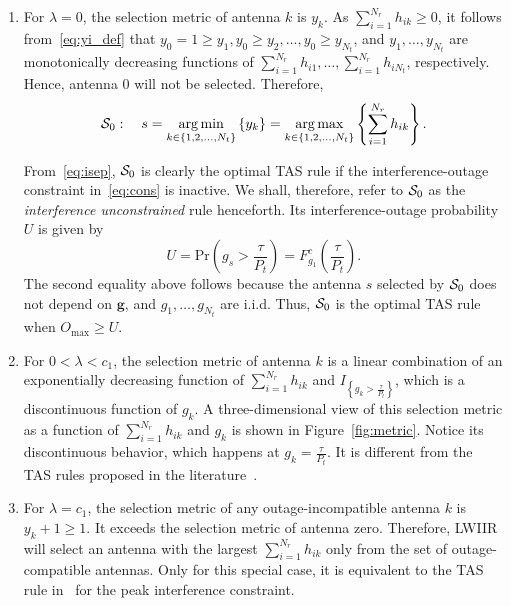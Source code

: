 \documentclass[12pt,draftcls,peerreview,onecolumn]{IEEEtran}
\newcommand{\brac}[1]{\left({#1}\right)}
\newcommand{\cbrac}[1]{\left\{{#1}\right\}}
\newcommand{\indic}[1]{I_{\cbrac{#1}}}
\newcommand{\ie}{{i.e.}}
\newcommand{\prob}[1]{\text{Pr}\brac{#1}}
\DeclareMathOperator*{\argmin}{arg\,min}
\DeclareMathOperator*{\argmax}{arg\,max}
\newcommand{\lam}{\lambda}
\newcommand{\Nt}{{N_t}}
\newcommand{\Nr}{{N_r}}
\newcommand{\Pt}{{P_t}}
\newcommand{\such}{h}
\newcommand{\puch}{g}
\newcommand{\hk}[1]{{\such_{#1}}}
\newcommand{\gk}[1]{{\puch_{#1}}}
\newcommand{\g}{\mathbf{\puch}}
\newcommand{\outmax}{O_{\text{max}}}
\newcommand{\itau}{\tau}
\newcommand{\cone}{c_{1}}
\newcommand{\taubypt}{\frac{\itau}{\Pt}}
\newcommand{\gkgrtaubypt}[1]{{\gk{#1}}>\taubypt}
\newcommand{\yk}[1]{y_{#1}}
\newcommand{\un}{U}
\newcommand{\antopts}{\left\{1,2,\ldots,\Nt\right\}}
\newcommand{\caluncons}{{\cal S_{\text{0}}}}
\newcommand{\sumnr}{\sum_{i=1}^{\Nr}}
\begin{document}
\begin{enumerate}
\item For $\lam=0$, the selection metric of antenna $k$ is $\yk{k}$. As $\sumnr\hk{ik}\geq 0$, it follows from~\eqref{eq:yi_def} that $\yk{0}=1\geq\yk{1},\yk{0}\geq\yk{2},\ldots,\yk{0}\geq\yk{\Nt}$, and   $\yk{1},\ldots,\yk{\Nt}$ are monotonically decreasing functions of $\sumnr\hk{i1},\ldots,\sumnr\hk{i\Nt}$, respectively. Hence, antenna 0 will not be selected. Therefore, 
\begin{equation}
\caluncons:\quad s = \argmin\limits_{k\in\antopts} \left\{ \yk{k} \right\} = \argmax\limits_{k\in\antopts} \left\{\sumnr \hk{ik} \right\}.
\label{eq:uncons_simple}
\end{equation}

From~\eqref{eq:isep}, $\caluncons$ is clearly the optimal TAS rule if the interference-outage constraint in~\eqref{eq:cons} is inactive. We shall, therefore, refer to $\caluncons$ as the {\em interference unconstrained} rule henceforth. Its interference-outage probability $\un$ is given by
%
\begin{equation}
\un= \prob{\gk{s}>\taubypt}= F^c_{\gk{1}}\!\!\left({\taubypt}\right).
\label{eq:uncomsoutage}
\end{equation}
%
The second equality above follows because the antenna $s$ selected by $\caluncons$ does not depend on $\g$, and $\gk{1},\ldots,\gk{\Nt}$ are i.i.d. Thus, $\caluncons$ is the optimal TAS rule when $\outmax \geq \un$. 

\item For $0<\lam<\cone$, the selection metric of antenna $k$ is a linear combination of  an exponentially decreasing function of $\sumnr\hk{ik}$ and $\indic{\gkgrtaubypt{k}}$, which is a discontinuous function of $\gk{k}$. A three-dimensional view of this selection metric as a function of $\sumnr\hk{ik}$ and $\gk{k}$ is shown in Figure~\ref{fig:metric}. Notice its discontinuous behavior, which happens at $\gk{k}=\taubypt$. It is different from the TAS rules proposed in the literature~\cite{Fakhan_2014_TSP,Wang_2010_TWC,Wang_2011_TCom,Sarvendranath_2013_TCOM,Sarvendranath_2014_TCOM}.

\item For $\lam=\cone$, the selection metric of any outage-incompatible antenna $k$ is  $\yk{k}+1\geq 1$. It exceeds the selection metric of antenna zero. Therefore, LWIIR will select an antenna with the largest $\sumnr\hk{ik}$ only from the set of outage-compatible antennas. Only for this special case, it is equivalent to the TAS rule in~\cite{Hanif_2015_globecom}  for the peak interference constraint.


\end{enumerate}
\end{document}
